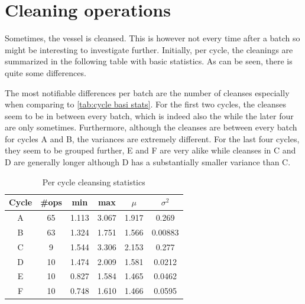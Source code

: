 \documentclass[../Thesis.tex]{subfiles}
\begin{document}







\newpage
\section{Cleaning operations}
Sometimes, the vessel is cleansed. This is however not every time after a batch so might be interesting to investigate further. Initially, per cycle, the cleanings are summarized in the following table with basic statistics. As can be seen, there is quite some differences.

The most notifiable differences per batch are the number of cleanses especially when comparing to \autoref{tab:cycle basi stats}. For the first two cycles, the cleanses seem to be in between every batch, which is indeed also the while the later four are only sometimes. Furthermore, although the cleanses are between every batch for cycles A and B, the variances are extremely different. For the last four cycles, they seem to be grouped further, E and F are very alike while cleanses in C and D are generally longer although D has a substantially smaller variance than C.

\begin{table}[h]
    \centering
    \begin{tabular}{c|c|c|c|c|c}
        Cycle & \#ops & min & max & $\mu$ & $\sigma^2$\\ \hline
        A & 65 & 1.113 & 3.067 & 1.917 & 0.269\\
        B & 63 & 1.324 & 1.751 & 1.566 & 0.00883\\
        C & 9  & 1.544 & 3.306 & 2.153 & 0.277\\
        D & 10 & 1.474 & 2.009 & 1.581 & 0.0212\\
        E & 10 & 0.827 & 1.584 & 1.465 & 0.0462\\
        F & 10 & 0.748 & 1.610 & 1.466 & 0.0595
    \end{tabular}
    \caption{Per cycle cleansing statistics}
    \label{tab:cycle cleansing stats stats}
\end{table}
\end{document}
